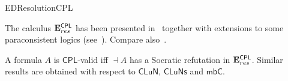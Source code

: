 \begin{entry}{EDResolutionCPL}
\begin{history}
The calculus $\mathbf{E}^\mathsf{CPL}_{res}$ has been presented in~\cite{SzChDLJ:LFI} together with extensions to some paraconsistent logics (see~). Compare also~.
\end{history}

\begin{technicalities}
A formula $A$ is $\mathsf{CPL}$-valid iff $\dashv A$ has a Socratic refutation in $\mathbf{E}^\mathsf{CPL}_{res}$. Similar results are obtained with respect to $\mathsf{CLuN}$, $\mathsf{CLuNs}$ and $\mathsf{mbC}$.
\end{technicalities}













\end{entry}
